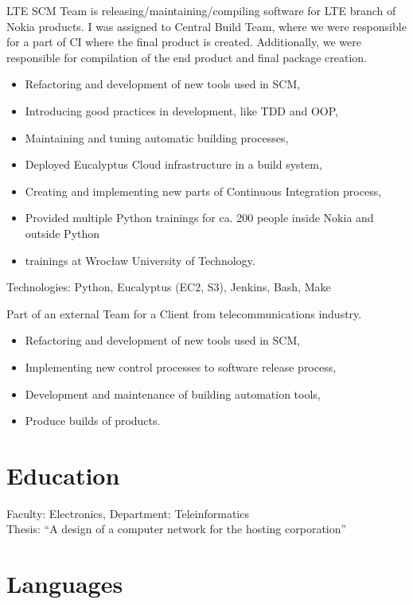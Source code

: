 \documentclass[11pt,a4paper,sans]{moderncv}
\newcommand{\newpara}{
        \vskip 0.2cm
    }
\begin{document}
%
    {}{}{
LTE SCM Team is releasing/maintaining/compiling software for LTE branch of Nokia
products. I was assigned to Central Build Team, where we were responsible for a
part of CI where the final product is created. Additionally, we were responsible for
compilation of the end product and final package creation.
\begin{itemize}
    \item Refactoring and development of new tools used in SCM,
    \item Introducing good practices in development, like TDD and OOP,
    \item Maintaining and tuning automatic building processes,
    \item Deployed Eucalyptus Cloud infrastructure in a build system,
    \item Creating and implementing new parts of Continuous Integration process,
    \item Provided multiple Python trainings for ca. 200 people inside Nokia and outside Python
    \item trainings at Wrocław University of Technology.
\end{itemize}
\newpara
Technologies: Python, Eucalyptus (EC2, S3), Jenkins, Bash, Make
}

%
    {}{}{
        Part of an external Team for a Client from telecommunications industry.
\begin{itemize}
    \item Refactoring and development of new tools used in SCM,
    \item Implementing new control processes to software release process,
    \item Development and maintenance of building automation tools,
    \item Produce builds of products.
\end{itemize}
}


\section{Education}
%
    {Faculty: Electronics, Department: Teleinformatics \\
    Thesis: “A design of a computer network for the hosting corporation”}

\section{Languages}
\end{document}
